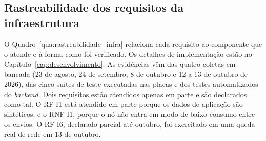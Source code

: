 
\subsection{Rastreabilidade dos requisitos da infraestrutura}
\label{subsec:rastreabilidade_infra}

O Quadro~\ref{qua:rastreabilidade_infra} relaciona cada requisito ao componente que o atende e à forma como foi verificado. Os detalhes de implementação estão no Capítulo~\ref{cap:desenvolvimento}. As evidências vêm das quatro coletas em bancada (23 de agosto, 24 de setembro, 8 de outubro e 12 a 13 de outubro de 2026), das cinco suítes de teste executadas nas placas e dos testes automatizados do \textit{backend}. Dois requisitos estão atendidos apenas em parte e são declarados como tal. O RF-I1 está atendido em parte porque os dados de aplicação são sintéticos, e o RNF-I1, porque o nó não entra em modo de baixo consumo entre os envios. O RF-I6, declarado parcial até outubro, foi exercitado em uma queda real de rede em 13 de outubro.

